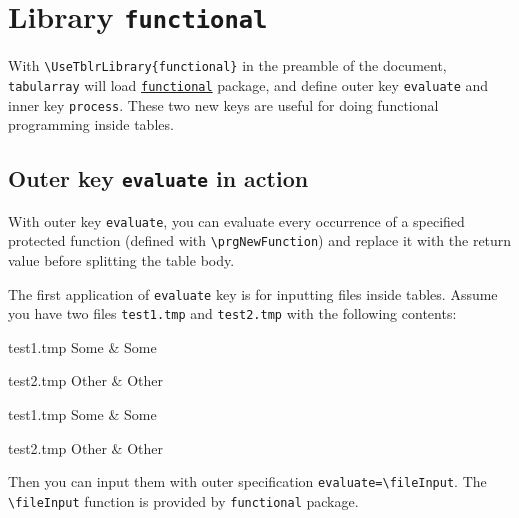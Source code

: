 \documentclass[oneside]{book}
\begin{document}
\section{Library \texttt{functional}}

With \verb!\UseTblrLibrary{functional}! in the preamble of the document,
\verb!tabularray! will load \href{https://ctan.org/pkg/functional}{\texttt{functional}} package,
and define outer key \verb!evaluate! and inner key \verb!process!.
These two new keys are useful for doing functional programming inside tables.

\subsection{Outer key \texttt{evaluate} in action}

With outer key \verb!evaluate!, you can evaluate every occurrence of a specified protected function
(defined with \verb!\prgNewFunction!) and replace it with the return value before splitting the table body.

The first application of \verb!evaluate! key is for inputting files inside tables.
Assume you have two files \verb!test1.tmp! and \verb!test2.tmp! with the following contents:

\begin{filecontents*}[overwrite]{test1.tmp}
Some & Some \\
\end{filecontents*}
\begin{filecontents*}[overwrite]{test2.tmp}
Other & Other \\
\end{filecontents*}

\begin{codehigh}
\begin{filecontents*}[overwrite]{test1.tmp}
Some & Some \\
\end{filecontents*}
\end{codehigh}

\begin{codehigh}
\begin{filecontents*}[overwrite]{test2.tmp}
Other & Other \\
\end{filecontents*}
\end{codehigh}

Then you can input them with outer specification \verb!evaluate=\fileInput!.
The \verb!\fileInput! function is provided by \verb!functional! package.
\end{document}
